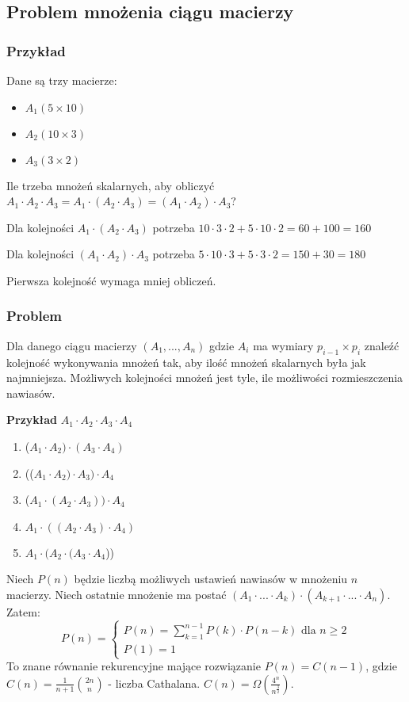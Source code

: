 \subsection{Problem mnożenia ciągu macierzy}
\subsubsection{Przykład}
Dane są trzy macierze:
\begin{itemize}
\item $ A_1 (5 \times 10) $
\item $ A_2 (10 \times 3) $
\item $ A_3 (3 \times 2) $
\end{itemize}

Ile trzeba mnożeń skalarnych, aby obliczyć $A_1 \cdot A_2 \cdot A_3 = A_1 \cdot (A_2 \cdot A_3) = (A_1 \cdot A_2) \cdot A_3$?

Dla kolejności $A_1 \cdot (A_2 \cdot A_3)$ potrzeba $10 \cdot 3 \cdot 2 + 5 \cdot  10 \cdot 2 = 60 + 100 = 160$

Dla kolejności $(A_1 \cdot A_2) \cdot A_3$ potrzeba $5 \cdot 10 \cdot 3 + 5 \cdot 3 \cdot 2 = 150 + 30 = 180$

Pierwsza kolejność wymaga mniej obliczeń.

\subsubsection{Problem}
Dla danego ciągu macierzy $(A_1, ...,  A_n)$ gdzie $A_i$ ma wymiary $p_{i-1} \times p_i$ znaleźć kolejność wykonywania mnożeń tak, aby ilość mnożeń skalarnych była jak najmniejsza. 
Możliwych kolejności mnożeń jest tyle, ile możliwości rozmieszczenia nawiasów.

\textbf{Przykład} $A_1 \cdot A_2 \cdot A_3 \cdot A_4$
\begin{enumerate}
\item ($A_1 \cdot A_2) \cdot (A_3 \cdot A_4)$
\item (($A_1 \cdot A_2) \cdot A_3) \cdot A_4$
\item ($A_1 \cdot (A_2 \cdot A_3)) \cdot A_4$
\item $A_1 \cdot ((A_2 \cdot A_3) \cdot A_4)$
\item $A_1 \cdot (A_2 \cdot (A_3 \cdot A_4$))
\end{enumerate}

Niech $P(n)$ będzie liczbą możliwych ustawień nawiasów w mnożeniu $n$ macierzy. Niech ostatnie mnożenie ma postać $(A_1 \cdot ... \cdot A_k) \cdot (A_{k+1} \cdot ... \cdot A_n)$. Zatem:
$$
P(n) = 	\begin{cases}
		P(n) = \sum_{k=1}^{n-1} P(k) \cdot P(n-k) \text{ dla } n \geq 2 \\
		P(1) = 1
		\end{cases}
$$
To znane równanie rekurencyjne mające rozwiązanie $P(n) = C(n-1)$, gdzie $C(n) = \frac{1}{n+1}\binom{2n}{n}$ - liczba Cathalana. $C(n) = \Omega(\frac{4^n}{n^\frac{3}{2}})$.

